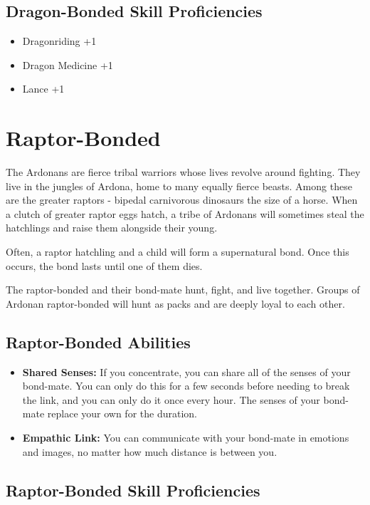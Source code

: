 \begin{multicols}{2}
\subsection{Dragon-Bonded Skill Proficiencies}

\begin{itemize}
  \item Dragonriding +1
  \item Dragon Medicine +1
  \item Lance +1
\end{itemize}

\section{Raptor-Bonded}

The Ardonans are fierce tribal warriors whose lives revolve around
fighting. They live in the jungles of Ardona, home to many equally
fierce beasts. Among these are the greater raptors - bipedal carnivorous
dinosaurs the size of a horse. When a clutch of greater raptor eggs hatch,
a tribe of Ardonans will sometimes steal the hatchlings and raise them
alongside their young.

Often, a raptor hatchling and a child will form a supernatural bond.
Once this occurs, the bond lasts until one of them dies.

The raptor-bonded and their bond-mate hunt, fight, and live together.
Groups of Ardonan raptor-bonded will hunt as packs and are deeply loyal
to each other.

\subsection{Raptor-Bonded Abilities}

\begin{itemize}
  \item \textbf{Shared Senses:} If you concentrate, you can share all
    of the senses of your bond-mate. You can only do this for a few seconds
    before needing to break the link, and you can only do it once every hour.
    The senses of your bond-mate replace your own for the duration.
  \item \textbf{Empathic Link:} You can communicate with your bond-mate
    in emotions and images, no matter how much distance is between you.
\end{itemize}

\subsection{Raptor-Bonded Skill Proficiencies}


\end{multicols}
